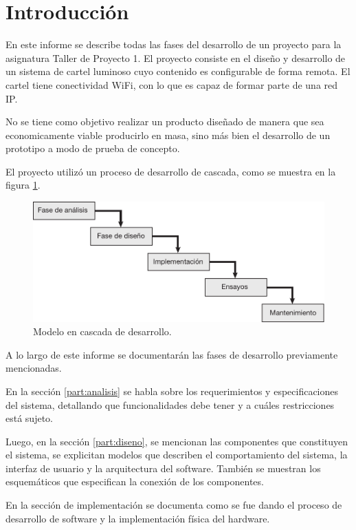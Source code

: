 \section{Introducción}
En este informe se describe todas las fases del desarrollo de un proyecto para la asignatura Taller de Proyecto 1. El proyecto consiste en el diseño y desarrollo de un sistema de cartel luminoso cuyo contenido es configurable de forma remota. El cartel tiene conectividad WiFi, con lo que es capaz de formar parte de una red IP.

No se tiene como objetivo realizar un producto diseñado de manera que sea economicamente viable producirlo en masa, sino más bien el desarrollo de un prototipo a modo de prueba de concepto.

El proyecto utilizó un proceso de desarrollo de cascada, como se muestra en la figura \ref{fig:waterfall}.

\begin{figure}[!htbp]
	\centering
	\includegraphics[width=\linewidth]{imagenes/waterfall.pdf}
	\caption{Modelo en cascada de desarrollo.}
	\label{fig:waterfall}
\end{figure}

A lo largo de este informe se documentarán las fases de desarrollo previamente mencionadas.

En la sección \ref{part:analisis} se habla sobre los requerimientos y especificaciones del sistema, detallando que funcionalidades debe tener y a cuáles restricciones está sujeto.

Luego, en la sección \ref{part:diseno}, se mencionan las componentes que constituyen el sistema, se explicitan modelos que describen el comportamiento del sistema, la interfaz de usuario y la arquitectura del software. También se muestran los esquemáticos que especifican la conexión de los componentes.

En la sección de implementación se documenta como se fue dando el proceso de desarrollo de software y la implementación física del hardware.

